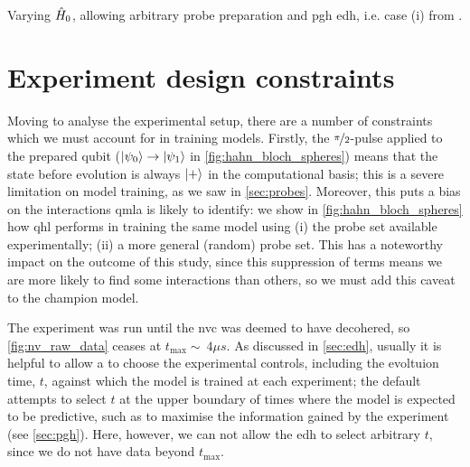 Varying $\hat{H}_0$, allowing arbitrary \gls{probe} preparation and \gls{pgh} \gls{edh}, 
    i.e. case (i) from \cite{gentile2020learning}. 

\section{Experiment design constraints}
Moving to analyse the experimental setup, there are a number of constraints which we must account for in 
    training models. 
Firstly, the $\nicefrac{\pi}{2}$-pulse applied to the prepared qubit ($\ket{\psi_0} \rightarrow \ket{\psi_1}$ in \cref{fig:hahn_bloch_spheres})
    means that the state before evolution is always $\ket{+}$ in the computational basis;
    this is a severe limitation on model training, as we saw in \cref{sec:probes}. 
Moreover, this puts a bias on the interactions \gls{qmla} is likely to identify:
    we show in \cref{fig:hahn_bloch_spheres} how \gls{qhl} performs in training the same model using 
    (i) the \gls{probe} set available experimentally; (ii) a more general (random) \gls{probe} set. 
This has a noteworthy impact on the outcome of this study, 
    since this suppression of terms means we are more likely to find some interactions
    than others, so we must add this caveat to the \gls{champion model}. 
\par

The experiment was run until the \gls{nvc} was deemed to have decohered, 
    so \cref{fig:nv_raw_data} ceases at $t_{\textrm{max}} \sim \ 4 \mu s$. 
As discussed in \cref{sec:edh}, usually it is helpful to allow a  to
    choose the experimental controls, including the evoltuion time, $t$, against which 
    the model is trained at each experiment;
    the default  attempts to select $t$ at the upper boundary of times 
    where the model is expected to be predictive, such as to maximise the information gained by the experiment (see \cref{sec:pgh}). 
Here, however, we can not allow the \gls{edh} to select arbitrary $t$, 
    since we do not have data beyond $t_{\textrm{max}}$. 

\par 

